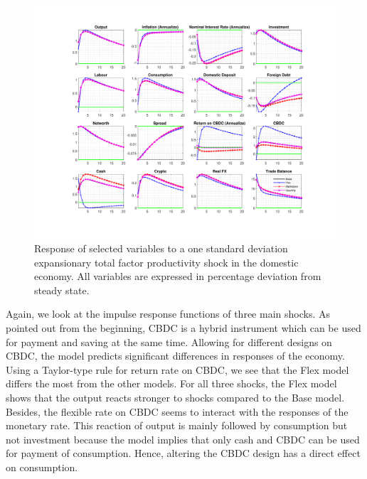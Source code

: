 \documentclass[12pt, a4paper]{article}
\begin{document}
\begin{figure}[H]
  \hspace{-0.7cm}
	\centering
	\centerline{\includegraphics[trim = 0mm 23mm 0mm 18mm, clip, scale=0.97]{TFP_alt.pdf}}
	\caption{Response of selected variables to a one standard deviation expansionary total factor productivity shock in the domestic economy. All variables are expressed in percentage deviation from steady state.}
	\label{TFPalt}
\end{figure}

Again, we look at the impulse response functions of three main shocks. As pointed out from the beginning, CBDC is a hybrid instrument which can be used for payment and saving at the same time. Allowing for different designs on CBDC, the model predicts significant differences in responses of the economy. Using a Taylor-type rule for return rate on CBDC, we see that the Flex model differs the most from the other models. For all three shocks, the Flex model shows that the output reacts stronger to shocks compared to the Base model. Besides, the flexible rate on CBDC seems to interact with the responses of the monetary rate. This reaction of output is mainly followed by consumption but not investment because the model implies that only cash and CBDC can be used for payment of consumption. Hence, altering the CBDC design has a direct effect on consumption. 
\end{document}
